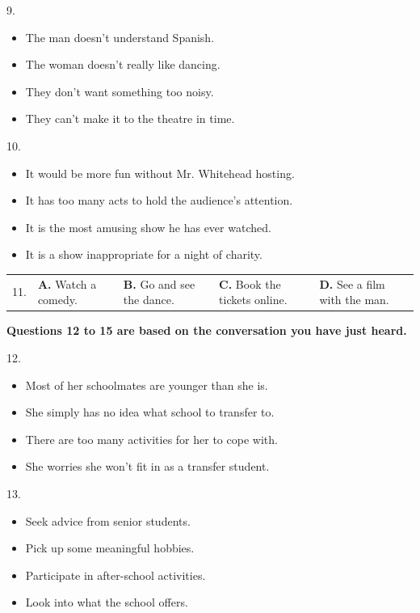 \documentclass[UTF8,11pt]{ctexart}
\begin{document}
9.


\begin{itemize}[leftmargin=2em,itemsep=.2em,topsep=.4em]\item[A.] The man doesn't understand Spanish.
\item[B.] The woman doesn't really like dancing.
\item[C.] They don't want something too noisy.
\item[D.] They can't make it to the theatre in time.
\end{itemize}

10.


\begin{itemize}[leftmargin=2em,itemsep=.2em,topsep=.4em]\item[A.] It would be more fun without Mr. Whitehead hosting.
\item[B.] It has too many acts to hold the audience's attention.
\item[C.] It is the most amusing show he has ever watched.
\item[D.] It is a show inappropriate for a night of charity.
\end{itemize}

\noindent\begin{tabularx}{\linewidth}{@{}lXXXX@{}}11. & \textbf{A.} Watch a comedy. & \textbf{B.} Go and see the dance. & \textbf{C.} Book the tickets online. & \textbf{D.} See a film with the man.\\\end{tabularx}\par

\textbf{Questions 12 to 15 are based on the conversation you have just heard.}


12.


\begin{itemize}[leftmargin=2em,itemsep=.2em,topsep=.4em]\item[A.] Most of her schoolmates are younger than she is.
\item[B.] She simply has no idea what school to transfer to.
\item[C.] There are too many activities for her to cope with.
\item[D.] She worries she won't fit in as a transfer student.
\end{itemize}

13.


\begin{itemize}[leftmargin=2em,itemsep=.2em,topsep=.4em]\item[A.] Seek advice from senior students.
\item[B.] Pick up some meaningful hobbies.
\item[C.] Participate in after-school activities.
\item[D.] Look into what the school offers.
\end{itemize}
\end{document}
